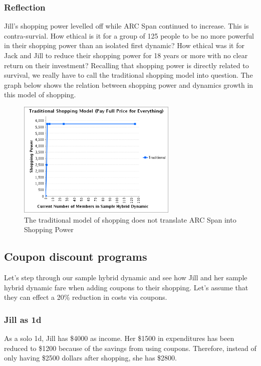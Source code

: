 \documentclass{article}%
\begin{document}
\subsubsection{Reflection}

Jill's shopping power levelled off while ARC Span continued to increase. This is contra-survial. How ethical is it for a group of 125 people to be no more powerful in their shopping power than an isolated first dynamic? How ethical was it for Jack and Jill to reduce their shopping power for 18 years or more with no clear return on their investment? Recalling that shopping power is directly related to survival, we really have to call the traditional shopping model into question. The graph below shows the relation between shopping power and dynamics growth in this model of shopping.

\begin{figure}[h]
\centering
	\includegraphics[width=3in]{shopping-traditional.png}
	\caption{The traditional model of shopping does not translate ARC Span into Shopping Power}
\end{figure}


\subsection{Coupon discount programs}

Let's step through our sample hybrid dynamic and see how Jill and her sample hybrid dynamic fare when adding coupons to their shopping. Let's assume that they can effect a 20\% reduction in costs via coupons. 

\subsubsection{Jill as 1d}
\label{1dcoupon}
As a solo 1d, Jill has \$4000 as income. Her \$1500 in expenditures has been reduced to \$1200 because of the savings from using coupons. Therefore, instead of only having \$2500 dollars after shopping, she has \$2800.
\end{document}
